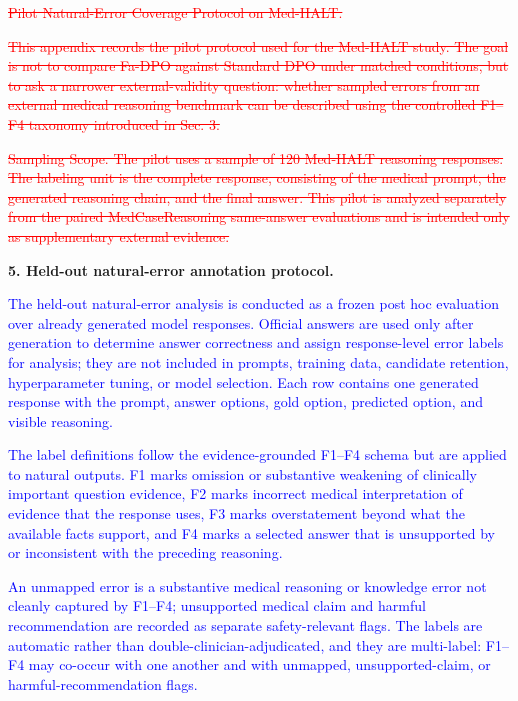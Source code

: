 \documentclass[12pt]{article}
\newcommand{\deleted}[1]{\textcolor{red}{\sout{#1}}}
\newcommand{\added}[1]{\textcolor{blue}{#1}}
\begin{document}
\begin{displayquote}
\deleted{Pilot Natural-Error Coverage Protocol on Med-HALT.}

\deleted{This appendix records the pilot protocol used for the Med-HALT study. The goal is not to compare Fa-DPO against Standard DPO under matched conditions, but to ask a narrower external-validity question: whether sampled errors from an external medical reasoning benchmark can be described using the controlled F1--F4 taxonomy introduced in Sec. 3.}

\deleted{Sampling Scope. The pilot uses a sample of 120 Med-HALT reasoning responses. The labeling unit is the complete response, consisting of the medical prompt, the generated reasoning chain, and the final answer. This pilot is analyzed separately from the paired MedCaseReasoning same-answer evaluations and is intended only as supplementary external evidence.}
\end{displayquote}

\textbf{5. Held-out natural-error annotation protocol.}
\begin{displayquote}
\added{The held-out natural-error analysis is conducted as a frozen post hoc evaluation over already generated model responses. Official answers are used only after generation to determine answer correctness and assign response-level error labels for analysis; they are not included in prompts, training data, candidate retention, hyperparameter tuning, or model selection. Each row contains one generated response with the prompt, answer options, gold option, predicted option, and visible reasoning.}

\added{The label definitions follow the evidence-grounded F1--F4 schema but are applied to natural outputs. F1 marks omission or substantive weakening of clinically important question evidence, F2 marks incorrect medical interpretation of evidence that the response uses, F3 marks overstatement beyond what the available facts support, and F4 marks a selected answer that is unsupported by or inconsistent with the preceding reasoning.}

\added{An unmapped error is a substantive medical reasoning or knowledge error not cleanly captured by F1--F4; unsupported medical claim and harmful recommendation are recorded as separate safety-relevant flags. The labels are automatic rather than double-clinician-adjudicated, and they are multi-label: F1--F4 may co-occur with one another and with unmapped, unsupported-claim, or harmful-recommendation flags.}
\end{displayquote}
\end{document}
